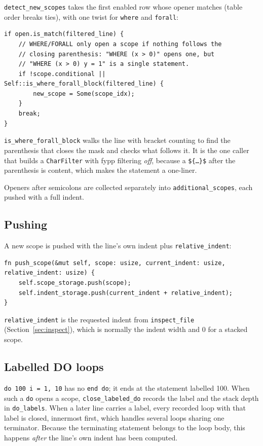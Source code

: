 \documentclass[11pt,a4paper,openany]{book}
\newcommand{\code}[1]{\texttt{\small #1}}
\begin{document}
\code{detect\_new\_scopes} takes the first enabled row whose opener matches
(table order breaks ties), with one twist for \code{where} and \code{forall}:

\begin{lstlisting}[style=rust]
if open.is_match(filtered_line) {
    // WHERE/FORALL only open a scope if nothing follows the
    // closing parenthesis: "WHERE (x > 0)" opens one, but
    // "WHERE (x > 0) y = 1" is a single statement.
    if !scope.conditional || Self::is_where_forall_block(filtered_line) {
        new_scope = Some(scope_idx);
    }
    break;
}
\end{lstlisting}

\code{is\_where\_forall\_block} walks the line with bracket counting to find the
parenthesis that closes the mask and checks what follows it. It is the one
caller that builds a \code{CharFilter} with fypp filtering \emph{off}, because a
\code{\$\{\ldots\}\$} after the parenthesis is content, which makes the statement
a one-liner.

Openers after semicolons are collected separately into
\code{additional\_scopes}, each pushed with a full indent.

\subsection{Pushing}

A new scope is pushed with the line's own indent plus \code{relative\_indent}:

\begin{lstlisting}[style=rust]
fn push_scope(&mut self, scope: usize, current_indent: usize, relative_indent: usize) {
    self.scope_storage.push(scope);
    self.indent_storage.push(current_indent + relative_indent);
}
\end{lstlisting}

\code{relative\_indent} is the requested indent from \code{inspect\_file}
(Section~\ref{sec:inspect}), which is normally the indent width and 0 for a
stacked scope.

\subsection{Labelled DO loops}

\code{do 100 i = 1, 10} has no \code{end do}; it ends at the statement labelled
100. When such a \code{do} opens a scope, \code{close\_labeled\_do} records the
label and the stack depth in \code{do\_labels}. When a later line carries a
label, every recorded loop with that label is closed, innermost first, which
handles several loops sharing one terminator. Because the terminating statement
belongs to the loop body, this happens \emph{after} the line's own indent has
been computed.
\end{document}
